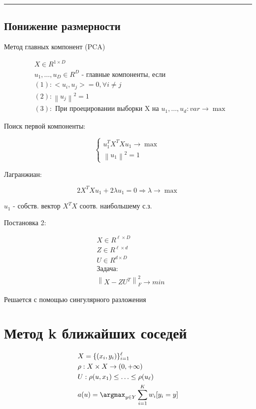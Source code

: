 \documentclass[a4paper, 12pt]{article}
\newcommand\norm[1]{\left\lVert#1\right\rVert}
\begin{document}
\rule{\linewidth}{0.5pt}

\subsection{Понижение размерности}

Метод главных компонент (PCA)

\begin{align*}
    & X \in R^{1\times D}\\
    & u_1, \ldots, u_D \in R^D \textrm{ - главные компоненты, если} \\
    &(1): <u_i, u_j> = 0, \forall i \neq j \\
    &(2): \norm{u_j}^2 = 1 \\
    &(3): \textrm{ При проецировании выборки X на } u_1, \ldots, u_d:
    var \rightarrow \max
\end{align*}

Поиск первой компоненты:

\[\begin{cases}
    u_1^T X^T X u_1 \rightarrow \max\\
    \norm{u_1}^2 = 1
\end{cases}\]

Лагранжиан:

\[2X^TX u_1 + 2\lambda u_1 = 0 \Rightarrow 
\lambda \rightarrow \max\]

$u_1$ - собств. вектор $X^TX$ соотв. наибольшему с.з.

Постановка 2:

\begin{align*}
    & X \in R^{\ell \times D} \\
    & Z \in R^{\ell \times d} \\
    & U \in R^{d \times D} \\
    & \textrm{Задача:} \\
    & \norm{X - ZU^T}_F^2 \rightarrow min
\end{align*}

Решается с помощью сингулярного разложения

\section{Метод k ближайших соседей}

\begin{align*}
    & X = \{(x_i, y_i)\}_{i = 1}^{\ell} \\
    & \rho: X \times X \rightarrow (0, +\infty) \\
    & U: \rho(u, x_1) \leq \ldots \leq \rho(u_{\ell}) \\
    & a(u) = \argmax_{y \in Y} \sum_{i = 1}^{K} w_i [y_i = y] 
\end{align*}
\end{document}
